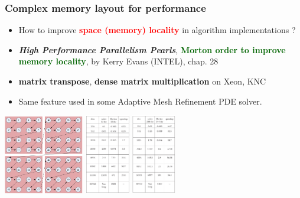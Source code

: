 \begin{frame}
  \frametitle{Complex memory layout for performance}

  \begin{itemize}
  \item How to improve \textcolor{red}{\textbf{space (memory) locality}} in algorithm implementations ?
  \item \textbf{\textit{High Performance Parallelism Pearls}}, \textcolor{darkgreen}{\textbf{Morton order to improve memory locality}}, by Kerry Evans (INTEL), chap. 28
  \item \textbf{matrix transpose}, \textbf{dense matrix multiplication} on Xeon, KNC
  \item Same feature used in some Adaptive Mesh Refinement PDE solver.
  \end{itemize}

  
  \begin{center}
    \includegraphics[width=3.5cm]{images/c28_morton_order}
    \hfill
    \includegraphics[height=3.5cm]{images/c28_MatrixMult_xeon1}
    \hfill
    \includegraphics[height=3.5cm]{images/c28_MatrixMult_MIC}
  \end{center}

\end{frame}
